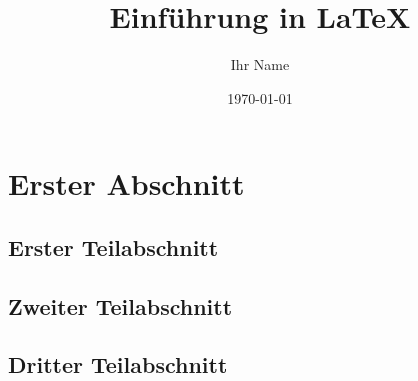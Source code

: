 \documentclass[twocolumn]{article}
\author{Ihr Name}
\date{\today}
\title{Einführung in \LaTeX}
\begin{document}
\maketitle

\tableofcontents

\section{Erster Abschnitt}

\subsection{Erster Teilabschnitt}

\lipsum[1-2]

\subsection{Zweiter Teilabschnitt}

\lipsum[3-4]

\subsection{Dritter Teilabschnitt}

\lipsum[5-6]
\end{document}

